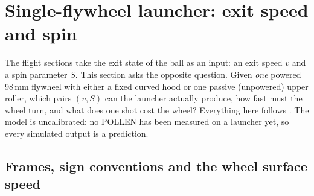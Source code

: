 \section{Single-flywheel launcher: exit speed and spin}
\label{sec:launcher}


The flight sections take the exit state of the ball as an input: an exit speed $v$ and a spin
parameter $S$. This section asks the opposite question. Given \emph{one} powered 98\,\unit{mm}\userval{}
flywheel with either a fixed curved hood or one passive (unpowered) upper roller, which pairs
$(v,S)$ can the launcher actually produce, how fast must the wheel turn, and what does one shot cost
the wheel? Everything here follows . The model is uncalibrated: no POLLEN has been
measured on a launcher yet, so every simulated output is a prediction.

\subsection{Frames, sign conventions and the wheel surface speed}
\label{sec:launcher:frames}

